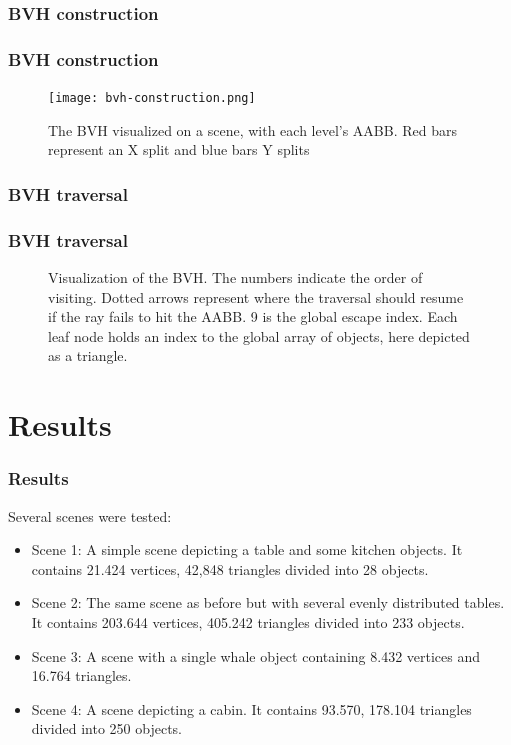 \documentclass{beamer}
\newenvironment{figure*}%
{\begin{figure}}
{\end{figure}}
\begin{document}
\subsubsection{BVH construction}
\begin{frame}
  \frametitle{BVH construction}
\begin{figure}
\centering
\texttt{[image: bvh-construction.png]}
\caption{The BVH visualized on a scene, with each level's AABB. Red
  bars represent an X split and blue bars Y splits}
\label{fig:bvh-construction}
\end{figure}

\end{frame}


\subsubsection{BVH traversal}
\begin{frame}
  \frametitle{BVH traversal}
\begin{figure}
\centering


\caption{Visualization of the BVH. The numbers indicate the order of
  visiting. Dotted arrows represent where the traversal should resume
  if the ray fails to hit the AABB. 9 is the global escape index. Each
  leaf node holds an index to the global array of objects, here
  depicted as a triangle.}
\label{fig:bvh}
\end{figure}

\end{frame}



\section{Results}
\begin{frame}
  \frametitle{Results}

Several scenes were tested:
\begin{itemize}
\item Scene 1: A simple scene depicting a table and some kitchen
  objects. It contains 21.424 vertices, 42,848 triangles divided into
  28 objects.
\item Scene 2: The same scene as before but with several evenly
  distributed tables. It contains 203.644 vertices, 405.242 triangles
  divided into 233 objects.
\item Scene 3: A scene with a single whale object containing 8.432
  vertices and 16.764 triangles.
\item Scene 4: A scene depicting a cabin. It contains 93.570, 178.104
  triangles divided into 250 objects.
\end{itemize}
\end{frame}
\end{document}
